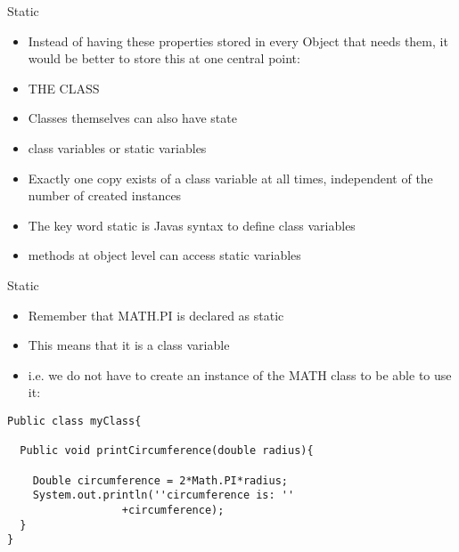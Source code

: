 \documentclass{beamer}
\begin{document}
\begin{frame}

Static

\begin{itemize}
\item Instead of having these properties stored in every Object that needs them, it would be better to store this at one
central point:
\item THE CLASS
\item Classes themselves can also have state
\item class variables or static variables
\item Exactly one copy exists of a class variable at all times, independent of the number of created instances
\item The key word static is Javas syntax to define class variables 
\item methods at object level can access static variables
\end{itemize}

\end{frame} 

\begin{frame}[fragile]

Static

\begin{itemize}
\item Remember that MATH.PI is declared as static
\item This means that it is a class variable
\item i.e. we do not have to create an instance of the MATH class to be able to use it:
\end{itemize}

\begin{block}{}
\begin{lstlisting}
Public class myClass{

  Public void printCircumference(double radius){

    Double circumference = 2*Math.PI*radius;
    System.out.println(''circumference is: '' 
                  +circumference);
  }
}
\end{lstlisting}
\end{block}
\end{frame} 
\end{document}
